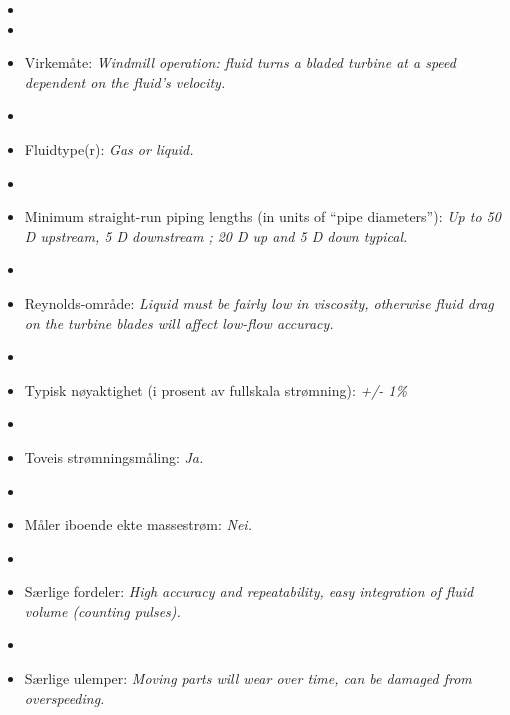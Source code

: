\begin{itemize}
\goodbreak
\item{} 
\vskip 5pt
\item\item{} Virkemåte: {\it Windmill operation: fluid turns a bladed turbine at a speed dependent on the fluid's velocity.}
\vskip 5pt
\item\item{} Fluidtype(r): {\it Gas or liquid.}
\vskip 5pt
\item\item{} Minimum straight-run piping lengths (in units of ``pipe diameters''): {\it Up to 50 D upstream, 5 D downstream ; 20 D up and 5 D down typical.}
\vskip 5pt
\item\item{} Reynolds-område: {\it Liquid must be fairly low in viscosity, otherwise fluid drag on the turbine blades will affect low-flow accuracy.}
\vskip 5pt
\item\item{} Typisk nøyaktighet (i prosent av fullskala strømning): {\it +/- 1\%}
\vskip 5pt
\item\item{} Toveis strømningsmåling: {\it Ja.}
\vskip 5pt
\item\item{} Måler iboende ekte massestrøm: {\it Nei.}
\vskip 5pt
\item\item{} Særlige fordeler: {\it High accuracy and repeatability, easy integration of fluid volume (counting pulses).}
\vskip 5pt
\item\item{} Særlige ulemper: {\it Moving parts will wear over time, can be damaged from overspeeding.}
\end{itemize}

